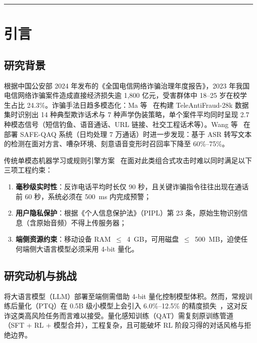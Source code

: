 \documentclass[UTF8,a4paper,10pt,twocolumn]{ctexart}
\theoremstyle{plain}
\begin{document}
\vspace{0.3cm}
\rule{\textwidth}{0.5pt}

\section{引言}

\subsection{研究背景}

根据中国公安部 2024 年发布的《全国电信网络诈骗治理年度报告》，2023 年我国电信网络诈骗案件造成直接经济损失逾 1,800 亿元，受害群体中 18--25 岁在校学生占比 24.3\%。诈骗手法日趋多模态化：Ma 等~\cite{ma2025teleantifraud} 在构建 TeleAntiFraud-28k 数据集时识别出 14 种典型欺诈话术与 7 种声学伪装策略，单个案件平均同时呈现 2.7 种模态信号（短信钓鱼、语音通话、URL 链接、社交工程话术等）。Wang 等~\cite{wang2026safe} 在部署 SAFE-QAQ 系统（日均处理 7 万通话）时进一步发现：基于 ASR 转写文本的检测在面对方言、嘈杂环境、刻意语音变形时召回率下降至 60\%--75\%。

传统单模态机器学习或规则引擎方案~\cite{tariq2020comprehensive,yusof2018sms} 在面对此类组合式攻击时难以同时满足以下三项工程约束：

\begin{enumerate}[label=(\roman*)]
\item \textbf{毫秒级实时性}：反诈电话平均时长仅 90 秒，且关键诈骗指令往往出现在通话前 60 秒，系统必须在 500~ms 内完成预警；
\item \textbf{用户隐私保护}：根据《个人信息保护法》（PIPL）第 23 条，原始生物识别信息（含原始音频）不得上传服务器；
\item \textbf{端侧资源约束}：移动设备 RAM~$\leq$~4~GB，可用磁盘~$\leq$~500~MB，迫使任何端侧大语言模型必须采用 4-bit 量化。
\end{enumerate}

\subsection{研究动机与挑战}

将大语言模型（LLM）部署至端侧需借助 4-bit 量化控制模型体积。然而，常规训练后量化（PTQ）在 0.5B 级小模型上会引入 6.0\%--12.5\% 的精度损失~\cite{xin2026qad}，这对反诈这类高风险任务而言难以接受。量化感知训练（QAT）需复刻原训练管道（SFT + RL + 模型合并），工程复杂，且可能破坏 RL 阶段习得的对话风格与拒绝边界。
\end{document}
